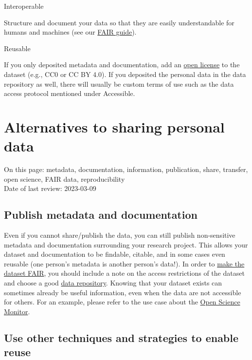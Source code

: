 \documentclass[
]{book}
\begin{document}
Interoperable

Structure and document your data so that they are easily understandable
for humans and machines (see our
\href{https://www.uu.nl/en/research/research-data-management/guides/how-to-make-your-data-fair}{FAIR guide}).

Reusable

If you only deposited metadata and documentation, add an
\href{https://www.uu.nl/en/research/research-data-management/guides/publishing-and-sharing-data}{open license}
to the dataset (e.g., CC0 or CC BY 4.0). If you deposited the personal data
in the data repository as well, there will usually be custom terms of use
such as the data access protocol mentioned under Accessible.

\hypertarget{sharing-reuse-alternatives}{%
\section{Alternatives to sharing personal data}\label{sharing-reuse-alternatives}}

On this page: metadata, documentation, information, publication, share, transfer,
open science, FAIR data, reproducibility\\
Date of last review: 2023-03-09

\hypertarget{publish-metadata}{%
\subsection{Publish metadata and documentation}\label{publish-metadata}}

Even if you cannot share/publish the data, you can still publish non-sensitive
metadata and documentation surrounding your research project. This allows your
dataset and documentation to be findable, citable, and in some cases even
reusable (one person's metadata is another person's data!). In order to
\href{https://www.uu.nl/en/research/research-data-management/guides/how-to-make-your-data-fair}{make the dataset FAIR},
you should include a note on the access restrictions of the dataset and choose
a good \href{https://tools.uu.nl/repository-decision-tool/}{data repository}.
Knowing that your dataset exists can sometimes already be useful information,
even when the data are not accessible for others. For an example, please refer to
the use case about the \protect\hyperlink{open-science-questionnaire}{Open Science Monitor}.

\hypertarget{reuse-strategies}{%
\subsection{Use other techniques and strategies to enable reuse}\label{reuse-strategies}}
\end{document}
